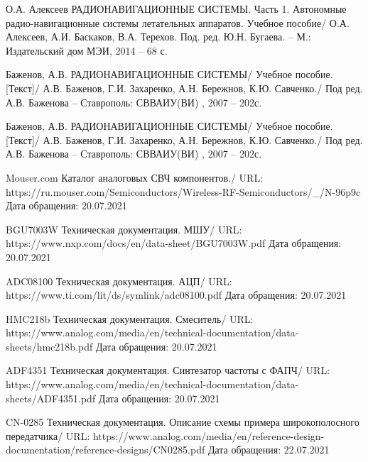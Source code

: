 \documentclass[utf8x, 14pt, oneside, a4paper]{article}
\begin{document}
	\pagebreak
	
	
	
	
	\begin{thebibliography}{3}
		
		О.А. Алексеев РАДИОНАВИГАЦИОННЫЕ СИСТЕМЫ. Часть 1. Автономные радио-навигационные системы летательных аппаратов. Учебное пособие/ О.А. Алексеев, А.И. Баскаков, В.А. Терехов. Под. ред. Ю.Н. Бугаева. – М.: Издательский дом МЭИ, 2014 – 68 с.
		
		Баженов, А.В. РАДИОНАВИГАЦИОННЫЕ СИСТЕМЫ/ Учебное пособие. [Текст]/ А.В. Баженов, Г.И. Захаренко, А.Н. Бережнов, К.Ю. Савченко./ Под ред. А.В. Баженова – Ставрополь: СВВАИУ(ВИ) , 2007 – 202с.
		
		Баженов, А.В. РАДИОНАВИГАЦИОННЫЕ СИСТЕМЫ/ Учебное пособие. [Текст]/ А.В. Баженов, Г.И. Захаренко, А.Н. Бережнов, К.Ю. Савченко./ Под ред. А.В. Баженова – Ставрополь: СВВАИУ(ВИ) , 2007 – 202с.
		
		Mouser.com Каталог аналоговых СВЧ компонентов./ URL: https://ru.mouser.com/Semiconductors/Wireless-RF-Semiconductors/\_/N-96p9c Дата обращения: 20.07.2021
		
		BGU7003W Техническая документация. МШУ/ URL: https://www.nxp.com/docs/en/data-sheet/BGU7003W.pdf Дата обращения: 20.07.2021
		
		ADC08100 Техническая документация. АЦП/ URL: https://www.ti.com/lit/ds/symlink/adc08100.pdf Дата обращения: 20.07.2021
		
		HMC218b Техническая документация. Смеситель/ URL: https://www.analog.com/media/en/technical-documentation/data-sheets/hmc218b.pdf Дата обращения: 20.07.2021
		
		ADF4351 Техническая документация. Синтезатор частоты с ФАПЧ/ URL: https://www.analog.com/media/en/technical-documentation/data-sheets/ADF4351.pdf Дата обращения: 20.07.2021
		
		CN-0285 Техническая документация. Описание схемы примера широкополосного передатчика/ URL: https://www.analog.com/media/en/reference-design-documentation/reference-designs/CN0285.pdf Дата обращения: 22.07.2021
		

\end{thebibliography}
\end{document}
